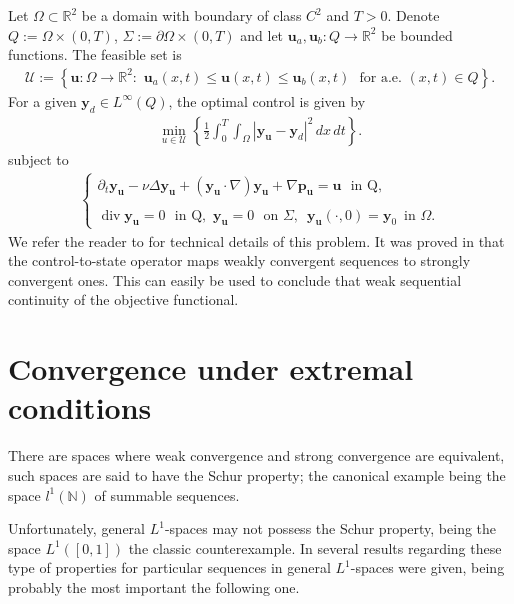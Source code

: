 \documentclass[hidelinks,onefignum,onetabnum]{siamart220329}
\DeclareMathOperator*{\dive}{div}
\begin{document}
Let $\Omega\subset\mathbb R^2$ be a domain with boundary of class $C^2$ and $T>0$. Denote $Q:=\Omega\times(0,T)$, $\Sigma:=\partial\Omega\times(0,T)$ and let  $\bm u_a,\bm u_b:Q\to\mathbb R^2$ be bounded functions. The feasible set is
\begin{align}
	\mathcal U:=\left\lbrace \bm u:\Omega\to\mathbb R^2:\,\, \bm u_a(x,t)\le\bm u(x,t)\le \bm u_b(x,t)\,\,\,\,\text{for a.e. $(x,t)\in Q$} \right\rbrace.
\end{align}
For a given $\bm{y}_d\in L^\infty(Q)$, the optimal control is given by
\begin{align}
	\min_{u\in\mathcal U}\left\lbrace \frac{1}{2}\int_{0}^T\int_\Omega |\bm{y_u} - \bm y_{d}|^2 \, dx\, dt\right\rbrace.
\end{align}
subject to
\begin{align}\label{dynsys}
	\left\{ \begin{array}{l}
		\partial_t\bm{y_u}- \nu\Delta \bm{y_u}+ (\bm{y_u}\cdot\nabla)\bm{y_u} + \nabla \bm{p_u} = \bm u\,\,\,\,\text{in Q},\\
		\\ \dive \bm{y_u}=0\,\,\,\,\text{in Q},\,\, \bm {y_u}=0\,\,\,\,\text{on $\Sigma$},\,\,\, \bm{y_u}(\cdot,0)=\bm y_0\,\,\,\text{in $\Omega$}.
	\end{array}
	\right.
\end{align}
We refer the reader to  \cite[Section 2]{Casasfluids} for technical details of this problem. It was proved in \cite[Corollary 2.4]{Casasfluids} that the control-to-state operator maps weakly convergent sequences to strongly convergent ones. This can easily be used to conclude that weak sequential continuity of the objective functional.

\appendix
\section{Convergence under extremal conditions} 
There are spaces where weak convergence and strong convergence are equivalent, such spaces are said to have the Schur property; the canonical example being  the space $l^1(\mathbb N)$ of summable sequences. 

Unfortunately, general $L^1$-spaces  may not  possess the Schur property, being  the space ${L^1([0,1])}$ the classic counterexample. 
In \cite{Visin} several results regarding these type of properties for  particular sequences in general $L^1$-spaces were given, being probably the most important the following one.
\end{document}
